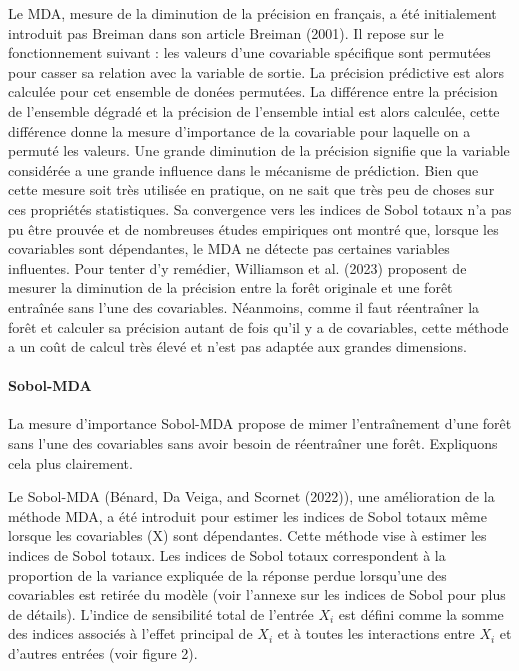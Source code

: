 \documentclass[
]{article}
\begin{document}
Le MDA, mesure de la diminution de la précision en français, a été
initialement introduit pas Breiman dans son article Breiman (2001). Il
repose sur le fonctionnement suivant : les valeurs d'une covariable
spécifique sont permutées pour casser sa relation avec la variable de
sortie. La précision prédictive est alors calculée pour cet ensemble de
donées permutées. La différence entre la précision de l'ensemble dégradé
et la précision de l'ensemble intial est alors calculée, cette
différence donne la mesure d'importance de la covariable pour laquelle
on a permuté les valeurs. Une grande diminution de la précision signifie
que la variable considérée a une grande influence dans le mécanisme de
prédiction. Bien que cette mesure soit très utilisée en pratique, on ne
sait que très peu de choses sur ces propriétés statistiques. Sa
convergence vers les indices de Sobol totaux n'a pas pu être prouvée et
de nombreuses études empiriques ont montré que, lorsque les covariables
sont dépendantes, le MDA ne détecte pas certaines variables influentes.
Pour tenter d'y remédier, Williamson et al. (2023) proposent de mesurer
la diminution de la précision entre la forêt originale et une forêt
entraînée sans l'une des covariables. Néanmoins, comme il faut
réentraîner la forêt et calculer sa précision autant de fois qu'il y a
de covariables, cette méthode a un coût de calcul très élevé et n'est
pas adaptée aux grandes dimensions.

\hypertarget{sobol-mda}{%
\paragraph{Sobol-MDA}\label{sobol-mda}}

La mesure d'importance Sobol-MDA propose de mimer l'entraînement d'une
forêt sans l'une des covariables sans avoir besoin de réentraîner une
forêt. Expliquons cela plus clairement.

Le Sobol-MDA (Bénard, Da Veiga, and Scornet (2022)), une amélioration de
la méthode MDA, a été introduit pour estimer les indices de Sobol totaux
même lorsque les covariables (X) sont dépendantes. Cette méthode vise à
estimer les indices de Sobol totaux. Les indices de Sobol totaux
correspondent à la proportion de la variance expliquée de la réponse
perdue lorsqu'une des covariables est retirée du modèle (voir l'annexe
sur les indices de Sobol pour plus de détails). L'indice de sensibilité
total de l'entrée \(X_i\) est défini comme la somme des indices associés
à l'effet principal de \(X_i\) et à toutes les interactions entre
\(X_i\) et d'autres entrées (voir figure 2).
\end{document}
